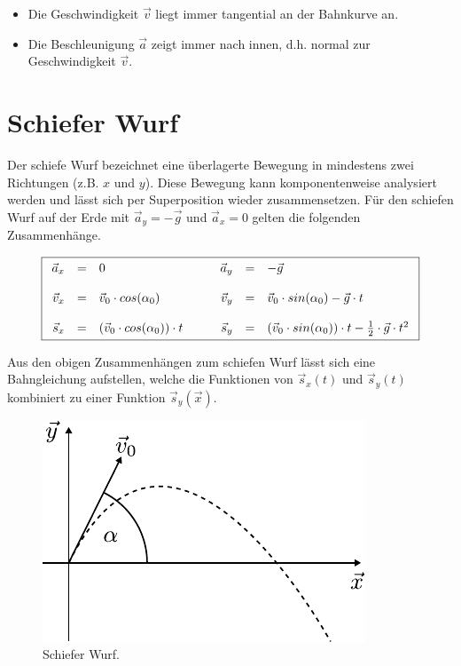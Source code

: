 \begin{itemize}
	\item Die Geschwindigkeit $\vec{v}$ liegt immer tangential an
		der Bahnkurve an.
	\item Die Beschleunigung $\vec{a}$ zeigt immer nach innen, 
		d.h. normal zur Geschwindigkeit $\vec{v}$.
\end{itemize}

\section{Schiefer Wurf}
Der schiefe Wurf bezeichnet eine überlagerte Bewegung in mindestens zwei
Richtungen (z.B. $x$ und $y$). Diese Bewegung kann komponentenweise 
analysiert werden und lässt sich per Superposition wieder zusammensetzen.
Für den schiefen Wurf auf der Erde mit $\vec{a}_y=-\vec{g}$ und 
$\vec{a}_x=0$ gelten die folgenden Zusammenhänge.

\[\boxed{\begin{array}{r c l  r c l}
	\vec{a}_x 
		&=& 0 
		& \qquad \vec{a}_y 
		&=& -\vec{g} \\
	 & & &  \\
	\vec{v}_x 
		&=& \vec{v}_0 \cdot cos(\alpha_0)
		& \vec{v}_y
		&=& \vec{v}_0 \cdot sin(\alpha_0) -\vec{g} \cdot t \\
	 & & & \\
	\vec{s}_x
		&=& \left( \vec{v}_0 \cdot cos(\alpha_0) \right) \cdot t
		& \vec{s}_y
		&=& \left( \vec{v}_0 \cdot sin(\alpha_0) \right) \cdot t 
			- \frac{1}{2} \cdot \vec{g} \cdot t^2
\end{array}}\]

\noindent
Aus den obigen Zusammenhängen zum schiefen Wurf lässt sich eine 
Bahngleichung aufstellen, welche die Funktionen von $\vec{s}_x(t)$ und
$\vec{s}_y(t)$ kombiniert zu einer Funktion $\vec{s}_y(\vec{x})$.

\begin{figure}[h!]
	\centering
	\includegraphics[scale=0.8]{../fig/wurf.pdf}
	\caption{Schiefer Wurf.}
	\label{fig:wurf}
\end{figure}

